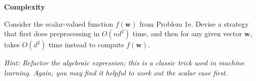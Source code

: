 \item {} {\bf Complexity}

Consider the scalar-valued function $f(\mathbf w)$ from Problem 1e. Devise a
strategy that first does preprocessing in $O(n d^2)$ time, and then for any
given vector $\mathbf w$, takes $O(d^2)$ time instead to compute $f(\mathbf w)$.

{\em Hint: Refactor the algebraic expression; this is a classic trick used in machine learning. Again, you may find it helpful to work out the scalar case first.}
